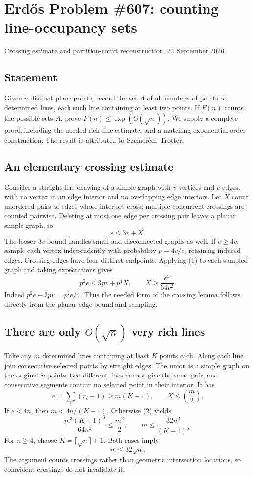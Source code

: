 \section{Erd\H{o}s Problem \#607: counting line-occupancy sets}
\noindent Crossing estimate and partition-count reconstruction, 24 September 2026.

\subsection*{Statement}
Given $n$ distinct plane points, record the set $A$ of all numbers of points on determined lines, each such line containing at least two points. If $F(n)$ counts the possible sets $A$, prove $F(n)\leq\exp(O(\sqrt n))$. We supply a complete proof, including the needed rich-line estimate, and a matching exponential-order construction. The result is attributed to Szemer\'edi--Trotter.

\subsection*{An elementary crossing estimate}
Consider a straight-line drawing of a simple graph with $v$ vertices and $e$ edges, with no vertex in an edge interior and no overlapping edge interiors. Let $X$ count unordered pairs of edges whose interiors cross; multiple concurrent crossings are counted pairwise. Deleting at most one edge per crossing pair leaves a planar simple graph, so
\[e\leq3v+X.\tag{1}\]
The looser $3v$ bound handles small and disconnected graphs as well.
If $e\geq4v$, sample each vertex independently with probability $p=4v/e$, retaining induced edges. Crossing edges have four distinct endpoints. Applying (1) to each sampled graph and taking expectations gives
\[p^2e\leq3pv+p^4X,\qquad
X\geq\frac{e^3}{64v^2}.\tag{2}\]
Indeed $p^2e-3pv=p^2e/4$. Thus the needed form of the crossing lemma follows directly from the planar edge bound and sampling.

\subsection*{There are only $O(\sqrt n)$ very rich lines}
Take any $m$ determined lines containing at least $K$ points each. Along each line join consecutive selected points by straight edges. The union is a simple graph on the original $n$ points: two different lines cannot give the same pair, and consecutive segments contain no selected point in their interior. It has
\[e=\sum_{\ell}(r_\ell-1)\geq m(K-1),\qquad
X\leq\binom m2.
\]
If $e<4n$, then $m<4n/(K-1)$. Otherwise (2) yields
\[\frac{m^3(K-1)^3}{64n^2}\leq\frac{m^2}{2},\qquad
m\leq\frac{32n^2}{(K-1)^3}.
\]
For $n\geq4$, choose $K=\lceil\sqrt n\rceil+1$. Both cases imply
\[m\leq32\sqrt n.\tag{3}\]
The argument counts crossings rather than geometric intersection locations, so coincident crossings do not invalidate it.


